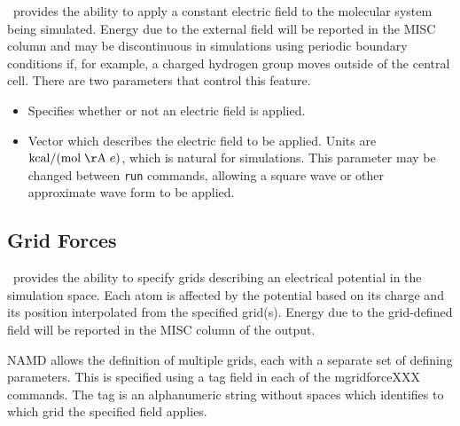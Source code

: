\NAMD\ provides the ability to apply a constant electric field to the molecular
system being simulated.
Energy due to the external field will be reported in the MISC column
and may be discontinuous in simulations using periodic boundary conditions if,
for example, a charged hydrogen group moves outside of the central cell.
There are two parameters that control this feature.

\begin{itemize}

\item
{}
{Specifies whether or not an electric field is applied.}

\item
{}
{Vector which describes the electric field to be applied.
Units are ${\rm kcal} / ({\rm mol \; \AA} \; e)$, which is natural for simulations.
This parameter may be changed between {\tt run} commands, allowing a square
wave or other approximate wave form to be applied.}

\end{itemize}

\subsection{Grid Forces}

\NAMD\ provides the ability to specify grids describing an electrical potential in the simulation space. Each atom is affected by the potential based on its charge and its position interpolated from the specified grid(s). Energy due to the grid-defined field will be reported in the MISC column of the output.

NAMD allows the definition of multiple grids, each with a separate set of defining parameters. This is specified using a tag field in each of the mgridforceXXX commands. The tag is an alphanumeric string without spaces which identifies to which grid the specified field applies.

